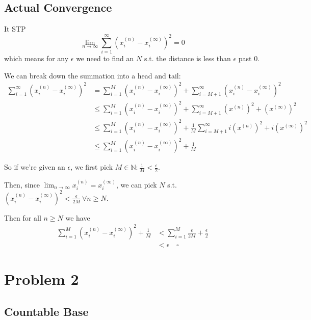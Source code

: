 \documentclass[12pt]{article}
\newcommand{\N}{\mathbb{N}}
\begin{document}
\pagebreak

\subsection{Actual Convergence}

It STP
\[\lim_{n \to \infty} \sum_{i=1}^{\infty} \left(x^{(n)}_i-x^{(\infty)}_i\right)^2 = 0\]
which means for any $\epsilon$ we need to find an $N$ s.t. the distance is less than $\epsilon$ past $0$.

We can break down the summation into a head and tail:
\begin{align*}
  \sum_{i=1}^{\infty} \left(x^{(n)}_i-x^{(\infty)}_i\right)^2
   & = \sum_{i=1}^{M} \left(x^{(n)}_i-x^{(\infty)}_i\right)^2
  + \sum_{i=M+1}^{\infty} \left(x^{(n)}_i-x^{(\infty)}_i\right)^2                          \\
   & \le \sum_{i=1}^{M} \left(x^{(n)}_i-x^{(\infty)}_i\right)^2
  + \sum_{i=M+1}^{\infty} \left(x^{(n)}\right)^2+\left(x^{(\infty)}\right)^2               \\
   & \le \sum_{i=1}^{M} \left(x^{(n)}_i-x^{(\infty)}_i\right)^2
  + \frac{1}{M} \sum_{i=M+1}^{\infty} i\left(x^{(n)}\right)^2+i\left(x^{(\infty)}\right)^2 \\
   & \le \sum_{i=1}^{M} \left(x^{(n)}_i-x^{(\infty)}_i\right)^2 + \frac{1}{M}
\end{align*}

So if we're given an $\epsilon$, we first pick $M \in \N: \frac{1}{M} < \frac{\epsilon}{2}$.

Then, since $\lim_{n \to \infty} x^{(n)}_i = x^{(\infty)}_i$,
we can pick $N$ s.t. $\left(x^{(n)}_i-x^{(\infty)}_i\right)^2 < \frac{\epsilon}{2M}\ \forall n \ge N$.

Then for all $n \ge N$ we have
\begin{align*}
  \sum_{i=1}^{M} \left(x^{(n)}_i-x^{(\infty)}_i\right)^2 + \frac{1}{M}
   & < \sum_{i=1}^{M} \frac{\epsilon}{2M} + \frac{\epsilon}{2} \\
   & < \epsilon\quad\square
\end{align*}

\pagebreak

\section{Problem 2}

\subsection{Countable Base}
\end{document}
